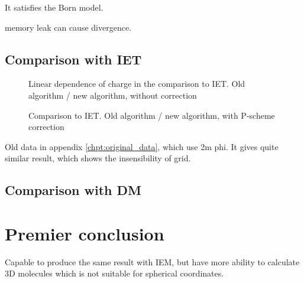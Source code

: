It satisfies the Born model.

memory leak can cause divergence.


\subsection{Comparison with IET}

\begin{figure}
\caption{Linear dependence of charge in the comparison to IET. Old algorithm
/ new algorithm, without correction}
\end{figure}


\begin{figure}
\caption{Comparison to IET. Old algorithm / new algorithm, with P-scheme correction}
\end{figure}


Old data in appendix \ref{chpt:original_data}, which use 2m phi.
It gives quite similar result, which shows the insensibility of grid.


\subsection{Comparison with DM }


\section{Premier conclusion}

Capable to produce the same result with IEM, but have more ability
to calculate 3D molecules which is not suitable for spherical coordinates.

